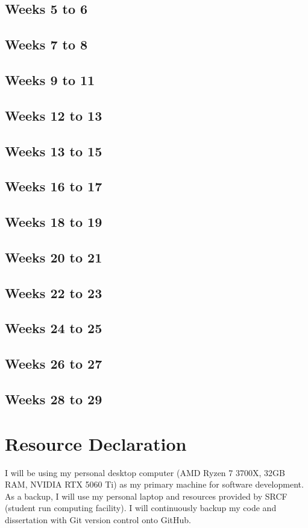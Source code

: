 \documentclass[20pt]{article}
\begin{document}
\subsection*{Weeks 5 to 6}

\subsection*{Weeks 7 to 8}

\subsection*{Weeks 9 to 11}

\subsection*{Weeks 12 to 13}

\subsection*{Weeks 13 to 15}

\subsection*{Weeks 16 to 17}

\subsection*{Weeks 18 to 19}

\subsection*{Weeks 20 to 21}

\subsection*{Weeks 22 to 23}
\subsection*{Weeks 24 to 25}

\subsection*{Weeks 26 to 27}
\subsection*{Weeks 28 to 29}

\section{Resource Declaration}

 I will be using my personal desktop computer (AMD Ryzen 7 3700X, 32GB RAM, NVIDIA RTX 5060 Ti) as my primary
 machine for software development. As a backup, I will use my personal laptop and resources provided by SRCF (student run computing facility). I will continuously backup my code and dissertation with Git version control onto GitHub.

\pagebreak
\end{document}
